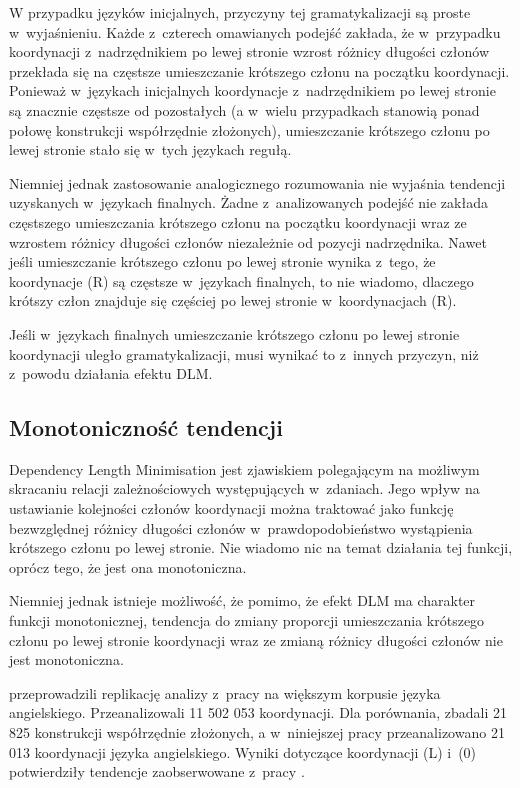 W przypadku języków inicjalnych, przyczyny tej gramatykalizacji są proste w~wyjaśnieniu. Każde z~czterech omawianych podejść zakłada, że w~przypadku  koordynacji z~nadrzędnikiem po lewej stronie wzrost różnicy długości członów przekłada się na częstsze umieszczanie krótszego członu na początku koordynacji. Ponieważ w~językach inicjalnych koordynacje z~nadrzędnikiem po lewej stronie są znacznie częstsze od pozostałych (a w~wielu przypadkach stanowią ponad połowę konstrukcji współrzędnie złożonych), umieszczanie krótszego członu po lewej stronie stało się w~tych językach regułą. 

Niemniej jednak zastosowanie analogicznego rozumowania nie wyjaśnia tendencji uzyskanych w~językach finalnych. Żadne z~analizowanych podejść nie zakłada częstszego umieszczania krótszego członu na początku koordynacji wraz ze wzrostem różnicy długości członów niezależnie od pozycji nadrzędnika. Nawet jeśli umieszczanie krótszego członu po lewej stronie wynika z~tego, że koordynacje (R) są częstsze w~językach finalnych, to nie wiadomo, dlaczego krótszy człon znajduje się częściej po lewej stronie w~koordynacjach (R).

Jeśli w~językach finalnych umieszczanie krótszego członu po lewej stronie koordynacji uległo gramatykalizacji, musi wynikać to z~innych przyczyn, niż z~powodu działania efektu DLM. 

\subsection{Monotoniczność tendencji}

Dependency Length Minimisation jest zjawiskiem polegającym na możliwym skracaniu relacji zależnościowych występujących w~zdaniach. Jego wpływ na ustawianie kolejności członów koordynacji można traktować jako funkcję bezwzględnej różnicy długości członów w~prawdopodobieństwo wystąpienia krótszego członu po lewej stronie. Nie wiadomo nic na temat działania tej funkcji, oprócz tego, że jest ona monotoniczna.

Niemniej jednak istnieje możliwość, że pomimo, że efekt DLM ma charakter funkcji monotonicznej, tendencja do zmiany proporcji umieszczania krótszego członu po lewej stronie koordynacji wraz ze zmianą różnicy długości członów nie jest monotoniczna. 

\cite{przepiorkowski2024argument} przeprowadzili replikację analizy z~pracy \cite{przepiorkowski2023conjunct} na większym korpusie języka angielskiego. Przeanalizowali 11 502 053 koordynacji. Dla porównania, \cite{przepiorkowski2023conjunct} zbadali 21 825 konstrukcji współrzędnie złożonych, a w~niniejszej pracy przeanalizowano 21 013 koordynacji języka angielskiego. Wyniki dotyczące koordynacji (L) i~(0) potwierdziły tendencje zaobserwowane z~pracy \cite{przepiorkowski2023conjunct}. 

